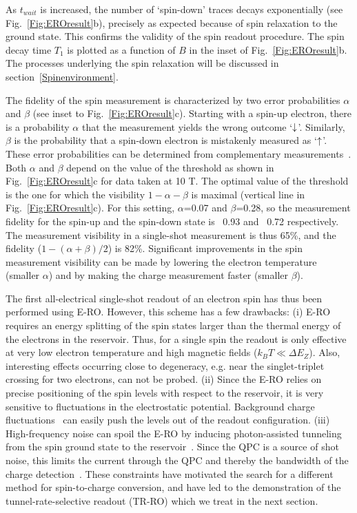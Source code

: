\documentclass[12pt,aps,nofootinbib]{revtex4-1}
\begin{document}
As $t_{wait}$ is increased, the number of `spin-down' traces
decays exponentially (see Fig.~\ref{Fig:EROresult}b), precisely as expected because of spin relaxation to the ground state. This confirms
the validity of the spin readout procedure. The spin decay time
$T_1$ is plotted as a function of $B$ in the inset of
Fig.~\ref{Fig:EROresult}b. The processes underlying the spin
relaxation will be discussed in section~\ref{Spinenvironment}.

The fidelity of the spin measurement is characterized by two error
probabilities $\alpha$ and $\beta$ (see inset to
Fig.~\ref{Fig:EROresult}c). Starting with a spin-up electron, there is a probability $\alpha$ that the measurement yields the wrong outcome `$\downarrow$'. Similarly, $\beta$ is the probability that a spin-down electron is mistakenly measured as `$\uparrow$'. These error probabilities can be determined from
complementary measurements~\cite{ElzermanNature2004}. Both
$\alpha$ and $\beta$ depend on the value of the threshold as shown
in Fig.~\ref{Fig:EROresult}c for data taken at 10 T. The optimal
value of the threshold is the one for which the visibility
$1-\alpha-\beta$ is maximal (vertical line in
Fig.~\ref{Fig:EROresult}c). For this setting, $\alpha$=0.07 and
$\beta$=0.28, so the measurement fidelity for the spin-up and the
spin-down state is ~0.93 and ~0.72 respectively. The measurement
visibility in a single-shot measurement is thus 65\%, and the
fidelity ($1-(\alpha+\beta)/2$) is 82\%. Significant improvements
in the spin measurement visibility can be made by lowering the
electron temperature (smaller $\alpha$) and by making the charge
measurement faster (smaller $\beta$).

The first all-electrical single-shot readout of an electron spin
has thus been performed using E-RO. However, this scheme has a few
drawbacks: (i) E-RO requires an energy splitting of the spin
states larger than the thermal energy of the electrons in the
reservoir. Thus, for a single spin the readout is only effective
at very low electron temperature and high magnetic fields ($k_B
T\ll \Delta E_Z$). Also, interesting effects occurring close to
degeneracy, e.g. near the singlet-triplet crossing for two
electrons, can not be probed. (ii) Since the E-RO relies on
precise positioning of the spin levels with respect to the
reservoir, it is very sensitive to fluctuations in the
electrostatic potential. Background charge
fluctuations~\cite{FujisawaChargeNoise} can easily push the levels
out of the readout configuration. (iii) High-frequency noise can
spoil the E-RO by inducing photon-assisted tunneling from the spin
ground state to the reservoir~\cite{OnacPRL2006}. Since the QPC is
a source of shot noise, this limits the current through the QPC
and thereby the bandwidth of the charge
detection~\cite{VandersypenAPL2004}. These constraints have
motivated the search for a different method for spin-to-charge
conversion, and have led to the demonstration of the
tunnel-rate-selective readout (TR-RO) which we treat in the next
section.
\end{document}
